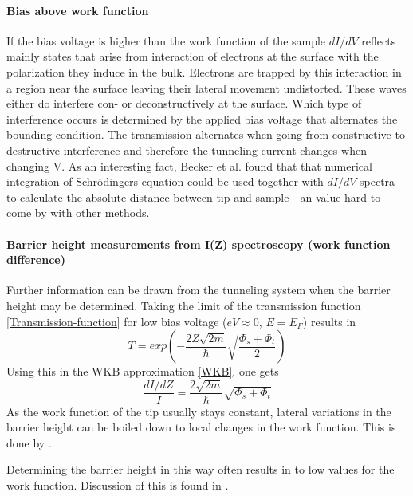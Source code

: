 \paragraph{Bias above work function}
If the bias voltage is higher than the work function of the sample $dI/dV$ reflects mainly states that arise from interaction of electrons at the surface with the polarization they induce in the bulk. Electrons are trapped by this interaction in a region near the surface leaving their lateral movement undistorted. These waves either do interfere con- or deconstructively at the surface. Which type of interference occurs is determined by the applied bias voltage that alternates the bounding condition. The transmission alternates when going from constructive to destructive interference and therefore the tunneling current changes when changing V. 
As an interesting fact, Becker et al.\cite{becker_electron_1985} found that that numerical integration of Schr\"odingers equation could be used together with $dI/dV$ spectra to calculate the absolute distance between tip and sample - an value hard to come by with other methods.

\paragraph{Barrier height measurements from I(Z) spectroscopy (work function difference)}
Further information can be drawn from the tunneling system when the barrier height may be determined.
Taking the limit of the transmission function \eqref{Transmission-function} for low bias voltage ($eV\approx0$, $E=E_F$) results in 
$$T=exp\left(-\frac{2Z\sqrt{2m}}{\hbar}\sqrt{\frac{\Phi_s+\Phi_t}{2}}\right)$$
Using this in the WKB approximation \eqref{WKB}, one gets $$\frac{dI/dZ}{I}=\frac{2\sqrt{2m}}{\hbar}\sqrt{\Phi_s+\Phi_t}$$
As the work function of the tip usually stays constant, lateral variations in the barrier height can be boiled down to local changes in the work function. This is done by \cite{jia_variation_1998}.

Determining the barrier height in this way often results in to low values for the work function. Discussion of this is found in \cite[96]{bonnell_scanning_1993}.

